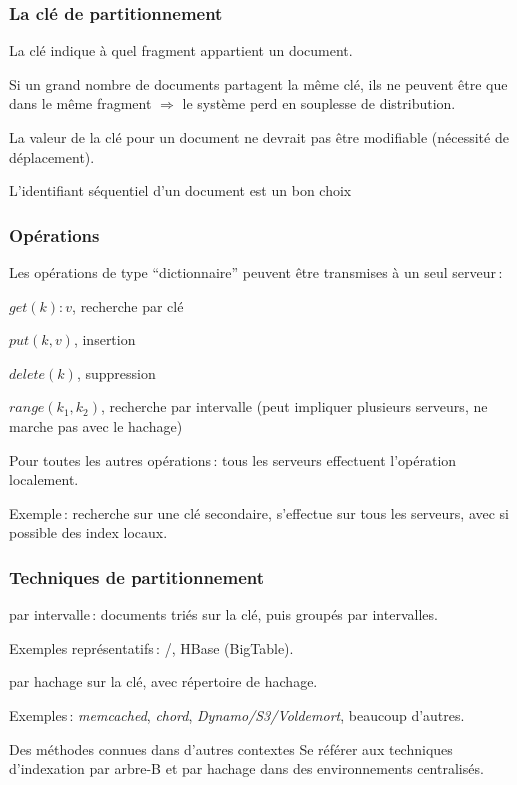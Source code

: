 \begin{frame}
\frametitle{La clé de partitionnement}

La clé indique à quel fragment appartient un document.

\vfill

Si un grand nombre de documents partagent la même clé, ils ne peuvent être que
dans le même fragment $\Rightarrow$ le système perd en souplesse de distribution.

\vfill

La valeur de la clé pour un document ne devrait pas être modifiable (nécessité de déplacement).

\vfill

\alert{L'identifiant séquentiel d'un document est un bon choix}

\end{frame}


\begin{frame}
\frametitle{Opérations}

Les opérations de type ``dictionnaire'' peuvent être transmises à \alert{un seul} serveur\,:

\begin{redbullet}
   \item $get(k): v$, recherche par clé
   \item $put (k, v)$, insertion
   \item $delete(k)$, suppression
   \item $range(k_1, k_2)$, recherche par intervalle (peut impliquer plusieurs serveurs, ne marche pas avec le hachage)
\end{redbullet}

\vfill

\alert{Pour toutes les autres opérations}\,: tous les serveurs effectuent l'opération localement.

\vfill

Exemple\,: recherche sur une clé secondaire, s'effectue sur \alert{tous} les serveurs, avec si possible des index locaux.
\end{frame}


\begin{frame}
\frametitle{Techniques de partitionnement}

\begin{redbullet}
   \item par \alert{intervalle}\,: documents triés sur la clé, puis groupés par intervalles.
   
     Exemples représentatifs\,: \mongodb/, HBase (BigTable).
     
   \item par \alert{hachage} sur la clé, avec répertoire de hachage.
   
       Exemples\,: \textit{memcached}, \textit{chord}, \textit{Dynamo/S3/Voldemort}, beaucoup d'autres.
 \end{redbullet}
 
\vfill

\begin{remblock}{Des méthodes connues dans d'autres contextes}
Se référer aux techniques d'indexation par arbre-B et par hachage dans des environnements centralisés.
\end{remblock}
\end{frame}

